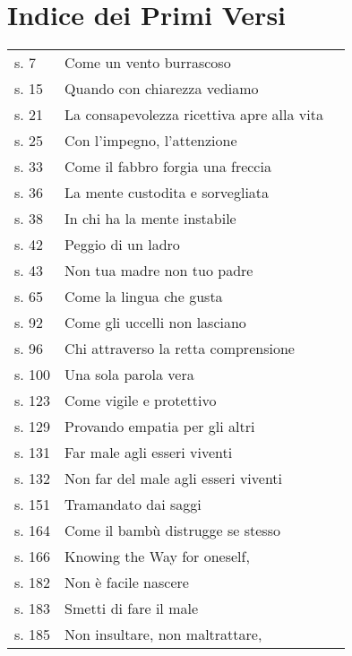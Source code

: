 \chapter{Indice dei Primi Versi}

{\smaller
\setlength{\parskip}{0pt}
\setlength{\parindent}{0pt}

\begin{longtable}[c]{llr}
s. 7 & Come un vento burrascoso & \pageref{dhp-7}\\
s. 15 & Quando con chiarezza vediamo & \pageref{dhp-15}\\
s. 21 & La consapevolezza ricettiva apre alla vita & \pageref{dhp-21}\\
s. 25 & Con l'impegno, l'attenzione & \pageref{dhp-25}\\
s. 33 & Come il fabbro forgia una freccia & \pageref{dhp-33}\\
s. 36 & La mente custodita e sorvegliata & \pageref{dhp-36}\\
s. 38 & In chi ha la mente instabile & \pageref{dhp-38}\\
s. 42 & Peggio di un ladro & \pageref{dhp-42}\\
s. 43 & Non tua madre non tuo padre & \pageref{dhp-43}\\
s. 65 & Come la lingua che gusta & \pageref{dhp-65}\\
s. 92 & Come gli uccelli non lasciano & \pageref{dhp-92}\\
s. 96 & Chi attraverso la retta comprensione & \pageref{dhp-96}\\
s. 100 & Una sola parola vera & \pageref{dhp-100}\\
s. 123 & Come vigile e protettivo & \pageref{dhp-123}\\
s. 129 & Provando empatia per gli altri & \pageref{dhp-129}\\
s. 131 & Far male agli esseri viventi & \pageref{dhp-131}\\
s. 132 & Non far del male agli esseri viventi & \pageref{dhp-132}\\
s. 151 & Tramandato dai saggi & \pageref{dhp-151}\\
s. 164 & Come il bambù distrugge se stesso & \pageref{dhp-164}\\
s. 166 & Knowing the Way for oneself, & \pageref{dhp-166}\\
s. 182 & Non è facile nascere & \pageref{dhp-182}\\
s. 183 & Smetti di fare il male & \pageref{dhp-183}\\
s. 185 & Non insultare, non maltrattare, & \pageref{dhp-185}\\

\end{longtable}}
